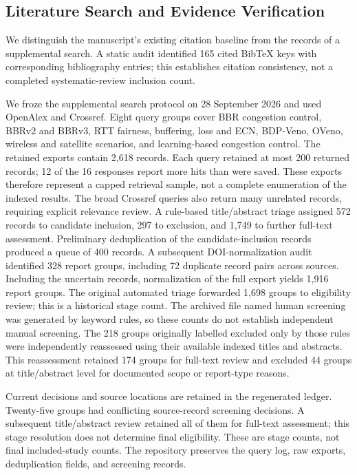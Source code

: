 \documentclass[a4paper,fleqn]{cas-sc}
\begin{document}
\subsection{Literature Search and Evidence Verification}
\label{sec:method}

We distinguish the manuscript's existing citation baseline from the records
of a supplemental search. A static audit identified 165 cited BibTeX keys
with corresponding bibliography entries; this establishes citation consistency,
not a completed systematic-review inclusion count.

We froze the supplemental search protocol on 28 September 2026 and used
OpenAlex and Crossref. Eight query groups cover BBR congestion control,
BBRv2 and BBRv3, RTT fairness, buffering, loss and ECN, BDP-Veno,
OVeno, wireless and satellite scenarios, and learning-based congestion control.
The retained exports contain 2,618 records. Each query retained at most
200 returned records; 12 of the 16 responses report more hits than were
saved. These exports therefore represent a capped retrieval sample, not
a complete enumeration of the indexed results. The broad Crossref queries
also return many unrelated records, requiring explicit relevance review. A rule-based title/abstract triage assigned
572 records to candidate inclusion, 297 to exclusion, and 1,749 to further
full-text assessment. Preliminary deduplication of the candidate-inclusion
records produced a queue of 400 records. A subsequent DOI-normalization
audit identified 328 report groups, including 72 duplicate record pairs
across sources. Including the uncertain records, normalization of the full
export yields 1,916 report groups. The original automated triage forwarded
1,698 groups to eligibility review; this is a historical stage count.
The archived file named human screening was generated by keyword rules,
so these counts do not establish independent manual screening.
The 218 groups originally labelled excluded only by those rules were
independently reassessed using their available indexed titles and abstracts.
This reassessment retained 174 groups for full-text review and excluded
44 groups at title/abstract level for documented scope or report-type reasons.

Current decisions and source locations are retained in the regenerated ledger.
Twenty-five groups had conflicting source-record screening decisions.
A subsequent title/abstract review retained all of them for full-text
assessment; this stage resolution does not determine final eligibility.
These are stage counts, not final
included-study counts. The repository preserves the query log, raw exports,
deduplication fields, and screening records.
\end{document}
